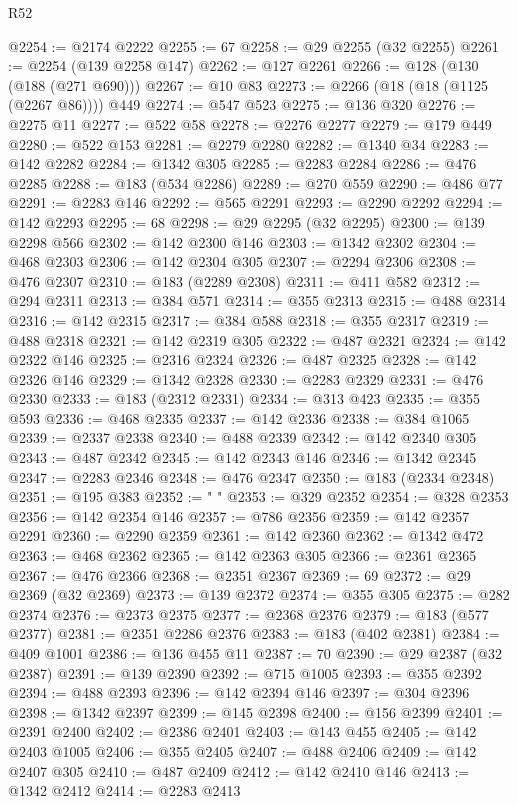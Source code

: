 \begin{lexlean}{R52}
\begin{coremodule}
@2254 := @2174 @2222
@2255 := 67
@2258 := @29 @2255 (@32 @2255)
@2261 := @2254 (@139 @2258 @147)
@2262 := @127 @2261
@2266 := @128 (@130 (@188 (@271 @690)))
@2267 := @10 @83
@2273 := @2266 (@18 (@18 (@1125 (@2267 @86)))) @449
@2274 := @547 @523
@2275 := @136 @320
@2276 := @2275 @11
@2277 := @522 @58
@2278 := @2276 @2277
@2279 := @179 @449
@2280 := @522 @153
@2281 := @2279 @2280
@2282 := @1340 @34
@2283 := @142 @2282
@2284 := @1342 @305
@2285 := @2283 @2284
@2286 := @476 @2285
@2288 := @183 (@534 @2286)
@2289 := @270 @559
@2290 := @486 @77
@2291 := @2283 @146
@2292 := @565 @2291
@2293 := @2290 @2292
@2294 := @142 @2293
@2295 := 68
@2298 := @29 @2295 (@32 @2295)
@2300 := @139 @2298 @566
@2302 := @142 @2300 @146
@2303 := @1342 @2302
@2304 := @468 @2303
@2306 := @142 @2304 @305
@2307 := @2294 @2306
@2308 := @476 @2307
@2310 := @183 (@2289 @2308)
@2311 := @411 @582
@2312 := @294 @2311
@2313 := @384 @571
@2314 := @355 @2313
@2315 := @488 @2314
@2316 := @142 @2315
@2317 := @384 @588
@2318 := @355 @2317
@2319 := @488 @2318
@2321 := @142 @2319 @305
@2322 := @487 @2321
@2324 := @142 @2322 @146
@2325 := @2316 @2324
@2326 := @487 @2325
@2328 := @142 @2326 @146
@2329 := @1342 @2328
@2330 := @2283 @2329
@2331 := @476 @2330
@2333 := @183 (@2312 @2331)
@2334 := @313 @423
@2335 := @355 @593
@2336 := @468 @2335
@2337 := @142 @2336
@2338 := @384 @1065
@2339 := @2337 @2338
@2340 := @488 @2339
@2342 := @142 @2340 @305
@2343 := @487 @2342
@2345 := @142 @2343 @146
@2346 := @1342 @2345
@2347 := @2283 @2346
@2348 := @476 @2347
@2350 := @183 (@2334 @2348)
@2351 := @195 @383
@2352 := " "
@2353 := @329 @2352
@2354 := @328 @2353
@2356 := @142 @2354 @146
@2357 := @786 @2356
@2359 := @142 @2357 @2291
@2360 := @2290 @2359
@2361 := @142 @2360
@2362 := @1342 @472
@2363 := @468 @2362
@2365 := @142 @2363 @305
@2366 := @2361 @2365
@2367 := @476 @2366
@2368 := @2351 @2367
@2369 := 69
@2372 := @29 @2369 (@32 @2369)
@2373 := @139 @2372
@2374 := @355 @305
@2375 := @282 @2374
@2376 := @2373 @2375
@2377 := @2368 @2376
@2379 := @183 (@577 @2377)
@2381 := @2351 @2286 @2376
@2383 := @183 (@402 @2381)
@2384 := @409 @1001
@2386 := @136 @455 @11
@2387 := 70
@2390 := @29 @2387 (@32 @2387)
@2391 := @139 @2390
@2392 := @715 @1005
@2393 := @355 @2392
@2394 := @488 @2393
@2396 := @142 @2394 @146
@2397 := @304 @2396
@2398 := @1342 @2397
@2399 := @145 @2398
@2400 := @156 @2399
@2401 := @2391 @2400
@2402 := @2386 @2401
@2403 := @143 @455
@2405 := @142 @2403 @1005
@2406 := @355 @2405
@2407 := @488 @2406
@2409 := @142 @2407 @305
@2410 := @487 @2409
@2412 := @142 @2410 @146
@2413 := @1342 @2412
@2414 := @2283 @2413

\end{coremodule}
\end{lexlean}

